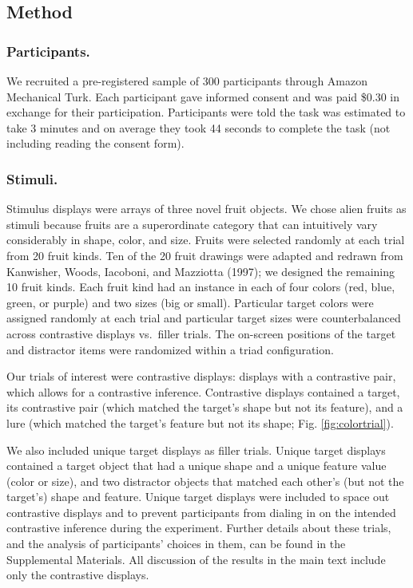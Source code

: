 \documentclass[
  english,
  man,floatsintext]{apa6}
\begin{document}
\hypertarget{method}{%
\subsection{Method}\label{method}}

\hypertarget{participants.}{%
\subsubsection{Participants.}\label{participants.}}

We recruited a pre-registered sample of 300 participants through Amazon Mechanical Turk. Each participant gave informed consent and was paid \$0.30 in exchange for their participation. Participants were told the task was estimated to take 3 minutes and on average they took 44 seconds to complete the task (not including reading the consent form).

\hypertarget{stimuli.}{%
\subsubsection{Stimuli.}\label{stimuli.}}

Stimulus displays were arrays of three novel fruit objects. We chose alien fruits as stimuli because fruits are a superordinate category that can intuitively vary considerably in shape, color, and size. Fruits were selected randomly at each trial from 20 fruit kinds. Ten of the 20 fruit drawings were adapted and redrawn from Kanwisher, Woods, Iacoboni, and Mazziotta (1997); we designed the remaining 10 fruit kinds. Each fruit kind had an instance in each of four colors (red, blue, green, or purple) and two sizes (big or small). Particular target colors were assigned randomly at each trial and particular target sizes were counterbalanced across contrastive displays vs.~filler trials. The on-screen positions of the target and distractor items were randomized within a triad configuration.

Our trials of interest were contrastive displays: displays with a contrastive pair, which allows for a contrastive inference. Contrastive displays contained a target, its contrastive pair (which matched the target's shape but not its feature), and a lure (which matched the target's feature but not its shape; Fig. \ref{fig:colortrial}).

We also included unique target displays as filler trials. Unique target displays contained a target object that had a unique shape and a unique feature value (color or size), and two distractor objects that matched each other's (but not the target's) shape and feature. Unique target displays were included to space out contrastive displays and to prevent participants from dialing in on the intended contrastive inference during the experiment. Further details about these trials, and the analysis of participants' choices in them, can be found in the Supplemental Materials. All discussion of the results in the main text include only the contrastive displays.
\end{document}
